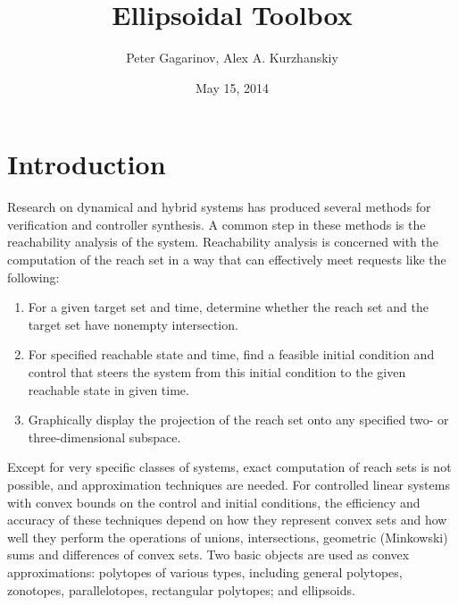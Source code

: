 \documentclass[letterpaper,10pt,english]{sphinxmanual}
\title{Ellipsoidal Toolbox}
\date{May 15, 2014}
\author{Peter Gagarinov, Alex A. Kurzhanskiy}
\begin{document}
\maketitle
\tableofcontents
{}\label{main_manual::doc}



\chapter{Introduction}
\label{chap_intro:introduction}\label{chap_intro::doc}\label{chap_intro:welcome-to-ellipsoidal-toolbox-documentation}
Research on dynamical and hybrid systems has produced several methods
for verification and controller synthesis. A common step in these
methods is the reachability analysis of the system. Reachability
analysis is concerned with the computation of the reach set in a way
that can effectively meet requests like the following:
\begin{enumerate}
\item {} 
For a given target set and time, determine whether the reach set and
the target set have nonempty intersection.

\item {} 
For specified reachable state and time, find a feasible initial
condition and control that steers the system from this initial
condition to the given reachable state in given time.

\item {} 
Graphically display the projection of the reach set onto any
specified two- or three-dimensional subspace.

\end{enumerate}

Except for very specific classes of systems, exact computation of reach
sets is not possible, and approximation techniques are needed. For
controlled linear systems with convex bounds on the control and initial
conditions, the efficiency and accuracy of these techniques depend on
how they represent convex sets and how well they perform the operations
of unions, intersections, geometric (Minkowski) sums and differences of
convex sets. Two basic objects are used as convex approximations:
polytopes of various types, including general polytopes, zonotopes,
parallelotopes, rectangular polytopes; and ellipsoids.
\end{document}

